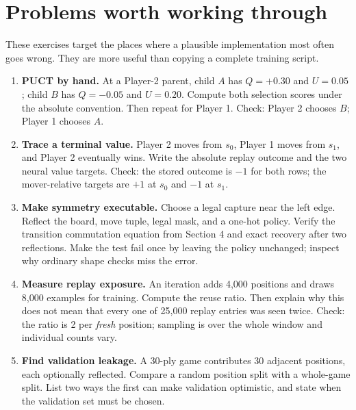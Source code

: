 \documentclass[10.5pt,letterpaper]{article}
\begin{document}
\section{Problems worth working through}

These exercises target the places where a plausible implementation most often
goes wrong. They are more useful than copying a complete training script.

\begin{enumerate}
  \item \textbf{PUCT by hand.} At a Player-2 parent, child $A$ has
        $Q=+0.30$ and $U=0.05$; child $B$ has $Q=-0.05$ and $U=0.20$.
        Compute both selection scores under the absolute convention. Then
        repeat for Player 1. Check: Player 2 chooses $B$; Player 1 chooses $A$.

  \item \textbf{Trace a terminal value.} Player 2 moves from $s_0$, Player 1
        moves from $s_1$, and Player 2 eventually wins. Write the absolute
        replay outcome and the two neural value targets. Check: the stored
        outcome is $-1$ for both rows; the mover-relative targets are $+1$ at
        $s_0$ and $-1$ at $s_1$.

  \item \textbf{Make symmetry executable.} Choose a legal capture near the
        left edge. Reflect the board, move tuple, legal mask, and a one-hot
        policy. Verify the transition commutation equation from Section 4 and
        exact recovery after two reflections. Make the test fail once by
        leaving the policy unchanged; inspect why ordinary shape checks miss
        the error.

  \item \textbf{Measure replay exposure.} An iteration adds 4,000 positions and
        draws 8,000 examples for training. Compute the reuse ratio. Then explain
        why this does not mean that every one of 25,000 replay entries was seen
        twice. Check: the ratio is 2 per \emph{fresh} position; sampling is over
        the whole window and individual counts vary.

  \item \textbf{Find validation leakage.} A 30-ply game contributes 30 adjacent
        positions, each optionally reflected. Compare a random position split
        with a whole-game split. List two ways the first can make validation
        optimistic, and state when the validation set must be chosen.


\end{enumerate}
\end{document}

